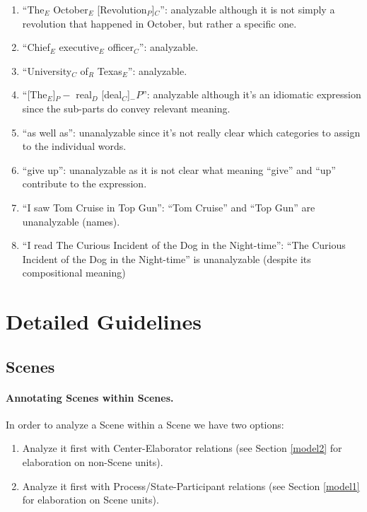 \documentclass[11pt]{article}
\newcommand{\oa}[1]{{\color{blue}{OA: #1}}}
\newcommand{\nss}[1]{{\color{magenta}{NSS: #1}}}
\begin{document}
\begin{enumerate}
\item
``The$_E$ October$_E$ [Revolution$_P$]$_C$'': analyzable although it is not
simply a revolution that happened in October, but rather a specific one.
\item
``Chief$_E$ executive$_E$ officer$_C$'': analyzable.
\item
``University$_C$ of$_R$ Texas$_E$'': analyzable.
\item
``[The$_E$]$_P-$ real$_D$ [deal$_C$]$_-P$'':
analyzable although it's an idiomatic expression
since the sub-parts do convey relevant meaning.

\item
``as well as'': unanalyzable since it's not really clear which
categories to assign to the individual words.
\item
``give up'': unanalyzable as it is not clear what meaning ``give'' and ``up'' contribute to the expression.
\item
``I saw Tom Cruise in Top Gun'': ``Tom Cruise'' and ``Top Gun'' are unanalyzable (names). 
\item
``I read The Curious Incident of the Dog in the Night-time'': ``The Curious Incident of the Dog in the Night-time'' is unanalyzable (despite its compositional meaning)
\end{enumerate}


\section{Detailed Guidelines}


\subsection{Scenes}

\paragraph{Annotating Scenes within Scenes.} 
In order to analyze a Scene within a Scene we have two options: 

\begin{enumerate}
\item Analyze it first with Center-Elaborator relations (see Section \ref{model2} for elaboration on non-Scene units).
\item Analyze it first with Process/State-Participant relations (see Section \ref {model1} for elaboration on Scene units). 
\end {enumerate}
\end{document}
